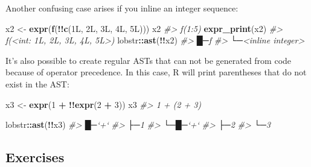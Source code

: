 \documentclass[]{book}
\newenvironment{Shaded}{\begin{snugshade}}{\end{snugshade}}
\newcommand{\CommentTok}[1]{\textcolor[rgb]{0.37,0.37,0.37}{\textit{#1}}}
\newcommand{\DecValTok}[1]{\textcolor[rgb]{0.06,0.06,0.06}{#1}}
\newcommand{\KeywordTok}[1]{\textcolor[rgb]{0.27,0.27,0.27}{\textbf{#1}}}
\newcommand{\NormalTok}[1]{#1}
\newcommand{\OperatorTok}[1]{\textcolor[rgb]{0.43,0.43,0.43}{\textbf{#1}}}
\newcommand{\StringTok}[1]{\textcolor[rgb]{0.5,0.5,0.5}{#1}}
\begin{document}
Another confusing case arises if you inline an integer sequence:

\begin{Shaded}
\begin{Highlighting}[]
\NormalTok{x2 <-}\StringTok{ }\KeywordTok{expr}\NormalTok{(}\KeywordTok{f}\NormalTok{(}\OperatorTok{!!}\KeywordTok{c}\NormalTok{(1L, 2L, 3L, 4L, 5L)))}
\NormalTok{x2}
\CommentTok{#> f(1:5)}
\KeywordTok{expr_print}\NormalTok{(x2)}
\CommentTok{#> f(<int: 1L, 2L, 3L, 4L, 5L>)}
\NormalTok{lobstr}\OperatorTok{::}\KeywordTok{ast}\NormalTok{(}\OperatorTok{!!}\NormalTok{x2)}
\CommentTok{#> █─f }
\CommentTok{#> └─<inline integer>}
\end{Highlighting}
\end{Shaded}

It's also possible to create regular ASTs that can not be generated from code because of operator precedence. In this case, R will print parentheses that do not exist in the AST:

\begin{Shaded}
\begin{Highlighting}[]
\NormalTok{x3 <-}\StringTok{ }\KeywordTok{expr}\NormalTok{(}\DecValTok{1} \OperatorTok{+}\StringTok{ }\OperatorTok{!!}\KeywordTok{expr}\NormalTok{(}\DecValTok{2} \OperatorTok{+}\StringTok{ }\DecValTok{3}\NormalTok{))}
\NormalTok{x3}
\CommentTok{#> 1 + (2 + 3)}

\NormalTok{lobstr}\OperatorTok{::}\KeywordTok{ast}\NormalTok{(}\OperatorTok{!!}\NormalTok{x3)}
\CommentTok{#> █─`+` }
\CommentTok{#> ├─1 }
\CommentTok{#> └─█─`+` }
\CommentTok{#>   ├─2 }
\CommentTok{#>   └─3}
\end{Highlighting}
\end{Shaded}

\hypertarget{exercises-6}{%
\subsection{Exercises}\label{exercises-6}}
\end{document}
